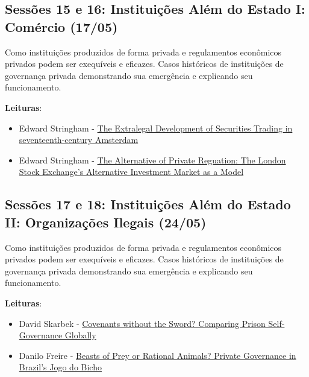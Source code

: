 \documentclass[12pt,]{article}
\providecommand{\tightlist}{%
  \setlength{\itemsep}{0pt}\setlength{\parskip}{0pt}}
\begin{document}
\subsection{Sessões 15 e 16: Instituições Além do Estado I: Comércio
(17/05)}\label{sessoes-15-e-16-instituicoes-alem-do-estado-i-comercio-1705}

Como instituições produzidos de forma privada e regulamentos econômicos
privados podem ser exequíveis e eficazes. Casos históricos de
instituições de governança privada demonstrando sua emergência e
explicando seu funcionamento.

\textbf{Leituras}:

\begin{itemize}
\tightlist
\item
  Edward Stringham -
  \href{https://github.com/danilofreire/economia-politica-instituicoes-ufm/blob/master/sessoes-15-16/stringham-01.pdf}{The
  Extralegal Development of Securities Trading in seventeenth-century
  Amsterdam}
\item
  Edward Stringham -
  \href{https://github.com/danilofreire/economia-politica-instituicoes-ufm/blob/master/sessoes-15-16/stringham-02.pdf}{The
  Alternative of Private Reguation: The London Stock Exchange's
  Alternative Investment Market as a Model}
\end{itemize}

\subsection{Sessões 17 e 18: Instituições Além do Estado II:
Organizações Ilegais
(24/05)}\label{sessoes-17-e-18-instituicoes-alem-do-estado-ii-organizacoes-ilegais-2405}

Como instituições produzidos de forma privada e regulamentos econômicos
privados podem ser exequíveis e eficazes. Casos históricos de
instituições de governança privada demonstrando sua emergência e
explicando seu funcionamento.

\textbf{Leituras}:

\begin{itemize}
\tightlist
\item
  David Skarbek -
  \href{https://github.com/danilofreire/economia-politica-instituicoes-ufm/blob/master/sessoes-17-18/skarbek.pdf}{Covenants
  without the Sword? Comparing Prison Self-Governance Globally}
\item
  Danilo Freire -
  \href{https://github.com/danilofreire/economia-politica-instituicoes-ufm/blob/master/sessoes-17-18/freire.pdf}{Beasts
  of Prey or Rational Animals? Private Governance in Brazil's Jogo do
  Bicho}
\end{itemize}
\end{document}
